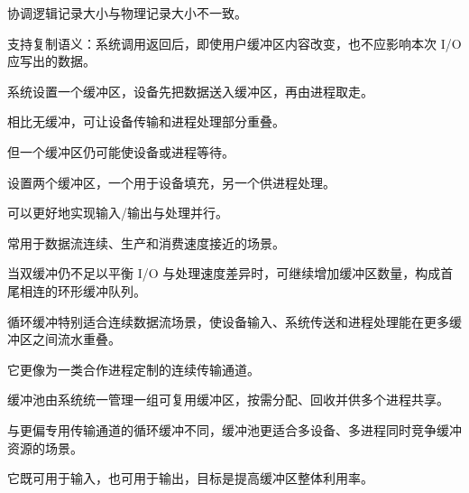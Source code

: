 \begin{points}
  \item 协调逻辑记录大小与物理记录大小不一致。
  \item 支持复制语义：系统调用返回后，即使用户缓冲区内容改变，也不应影响本次 I/O 应写出的数据。
\end{points}


\begin{points}
  \item 系统设置一个缓冲区，设备先把数据送入缓冲区，再由进程取走。
  \item 相比无缓冲，可让设备传输和进程处理部分重叠。
  \item 但一个缓冲区仍可能使设备或进程等待。
\end{points}


\begin{points}
  \item 设置两个缓冲区，一个用于设备填充，另一个供进程处理。
  \item 可以更好地实现输入/输出与处理并行。
  \item 常用于数据流连续、生产和消费速度接近的场景。
\end{points}


\begin{points}
  \item 当双缓冲仍不足以平衡 I/O 与处理速度差异时，可继续增加缓冲区数量，构成首尾相连的环形缓冲队列。
  \item 循环缓冲特别适合连续数据流场景，使设备输入、系统传送和进程处理能在更多缓冲区之间流水重叠。
  \item 它更像为一类合作进程定制的连续传输通道。
\end{points}

\begin{points}
  \item 缓冲池由系统统一管理一组可复用缓冲区，按需分配、回收并供多个进程共享。
  \item 与更偏专用传输通道的循环缓冲不同，缓冲池更适合多设备、多进程同时竞争缓冲资源的场景。
  \item 它既可用于输入，也可用于输出，目标是提高缓冲区整体利用率。
\end{points}



